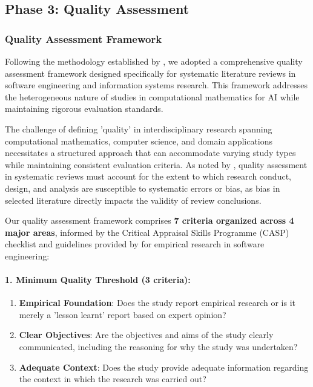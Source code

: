 \documentclass[acmsmall]{acmart}
\begin{document}
\subsection{Phase 3: Quality Assessment}\label{subsec:phase-3-quality-assessment}

\subsubsection{Quality Assessment Framework}\label{subsubsec:phase-3-quality-assessment:quality-assessment-framework}
Following the methodology established by \citet{ataei2022state}, we adopted a comprehensive quality assessment framework designed specifically for systematic literature reviews in software engineering and information systems research. This framework addresses the heterogeneous nature of studies in computational mathematics for AI while maintaining rigorous evaluation standards.

The challenge of defining 'quality' in interdisciplinary research spanning computational mathematics, computer science, and domain applications necessitates a structured approach that can accommodate varying study types while maintaining consistent evaluation criteria. As noted by \citet{ataei2022state}, quality assessment in systematic reviews must account for the extent to which research conduct, design, and analysis are susceptible to systematic errors or bias, as bias in selected literature directly impacts the validity of review conclusions.

Our quality assessment framework comprises \textbf{7 criteria organized across 4 major areas}, informed by the Critical Appraisal Skills Programme (CASP) checklist \citep{CASP2018} and guidelines provided by \citet{kitchenham2007guidelines} for empirical research in software engineering:

\paragraph{1. Minimum Quality Threshold (3 criteria):}
\begin{enumerate}[label=\alph*)]
    \item \textbf{Empirical Foundation}: Does the study report empirical research or is it merely a 'lesson learnt' report based on expert opinion?
    \item \textbf{Clear Objectives}: Are the objectives and aims of the study clearly communicated, including the reasoning for why the study was undertaken?
    \item \textbf{Adequate Context}: Does the study provide adequate information regarding the context in which the research was carried out?
\end{enumerate}
\end{document}
